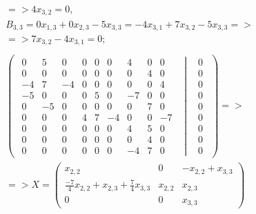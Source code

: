 \begin{gather*}
        => 4x_{3, 2} = 0,\\
    B_{3, 3} = 0x_{1, 3} + 0x_{2, 3} -5x_{3, 3} = -4x_{3, 1} +  7x_{3, 2} - 5x_{3, 3} => \\
        =>7x_{3, 2} - 4x_{3, 1} = 0;\\
    \\
    \begin{pmatrix}
        \left.\begin{matrix}
            0 & 5 & 0 & 0 & 0 & 0 & 4 & 0 & 0 &\\
            0 & 0 & 0 & 0 & 0 & 0 & 0 & 4 & 0 &\\
            -4 & 7 & -4 & 0 & 0 & 0 & 0 & 0 & 4 &\\
            -5 & 0 & 0 & 0 & 5 & 0 & -7 & 0 & 0 &\\
            0 & -5 & 0 & 0 & 0 & 0 & 0 & 7 & 0 &\\
            0 & 0 & 0 & 4 & 7 & -4 & 0 & 0 & -7 &\\
            0 & 0 & 0 & 0 & 0 & 0 & 4 & 5 & 0 &\\
            0 & 0 & 0 & 0 & 0 & 0 & 0 & 4 & 0 &\\
            0 & 0 & 0 & 0 & 0 & 0 & -4 & 7 & 0 &
        \end{matrix}\right|
        \begin{matrix}
            &0 \\ &0 \\ &0 \\ &0 \\ &0 \\ &0 \\ &0 \\ &0 \\ &0
        \end{matrix}
    \end{pmatrix} => \\
    => X = \begin{pmatrix}
        x_{2, 2}
        & 0
        & -x_{2, 2} + x_{3, 3}\\
        \frac{-7}{4}x_{2, 2} + x_{2, 3} + \frac{7}{4}x_{3, 3}
        & x_{2, 2}
        & x_{2, 3}\\
        0
        & 0
        & x_{3, 3}
    \end{pmatrix}
\end{gather*}


